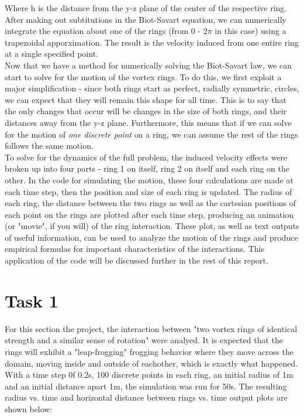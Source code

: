 \documentclass[10pt]{article}
\begin{document}
Where h is the distance from the y-z plane of the center of the respective ring. After making out subtitutions in the Biot-Savart equation, we can numerically integrate the equation about one of the rings (from 0 - 2$\pi$ in this case) using a trapezoidal apporximation. The result is the velocity induced from one entire ring at a single specified point.\\

Now that we have a method for numerically solving the Biot-Savart law, we can start to solve for the motion of the vortex rings. To do this, we first exploit a major simplification - since both rings start as perfect, radially symmetric, circles, we can expect that they will remain this shape for all time. This is to say that the only changes that occur will be changes in the size of both rings, and their distances away from the y-z plane. Furthermore, this means that if we can solve for the motion of \textit{one discrete point} on a ring, we can assume the rest of the rings follows the same motion.\\

To solve for the dynamics of the full problem,  the induced velocity effects were broken up into four parts - ring 1 on itself, ring 2 on itself and each ring on the other. In the code for simulating the motion, these four calculations are made at each time step, then the position and size of each ring is updated. The radius of each ring, the distance between the two rings as well as the cartesian positions of each point on the rings are plotted after each time step, producing an animation (or "movie", if you will) of the ring interaction. These plot, as well as text outputs of useful information, can be used to analyze the motion of the rings and produce empirical formulas for important characteristics of the interactions. This application of the code will be discussed further in the rest of this report.

\section{Task 1}

For this section the project, the interaction between "two vortex rings of identical strength and a similar sense of rotation" were analyed. It is expected that the rings will exhibit a "leap-frogging" frogging behavior where they move across the domain, moving inside and outside of eachother, which is exactly what happened.\\
With a time step 0f 0.2s, 100 discrete points in each ring, an initial radius of 1m and an initial distance apart 1m, the simulation was run for 50s. The resulting radius vs. time and horizontal distance between rings vs. time output plots are shown below:
\end{document}

